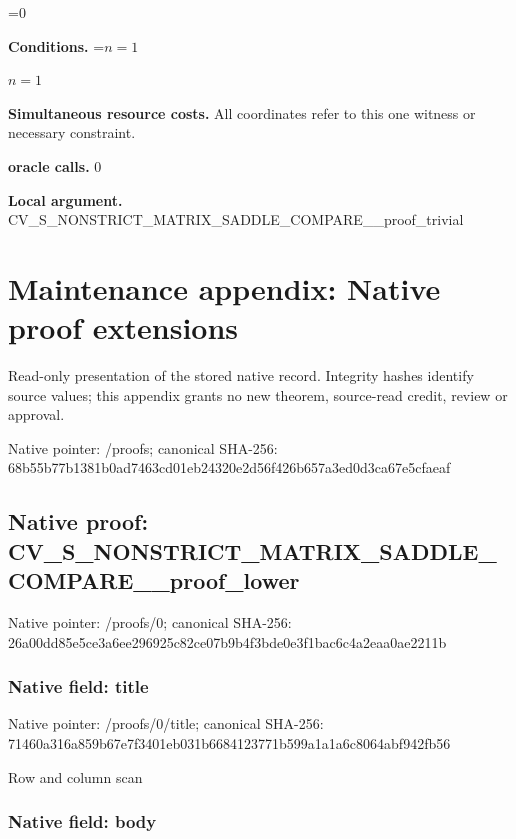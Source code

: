 \documentclass[10pt,a4paper]{article}
\newcommand{\AtlasMath}[1]{\par\begingroup\centering\setbox0=\hbox{$\displaystyle #1$}\ifdim\wd0>1.4\linewidth\typeout{ATLAS WIDE FORMULA: \the\wd0}\fi\ifdim\wd0>\linewidth\resizebox{\linewidth}{!}{\box0}\else\box0\fi\par\endgroup}
\newcommand{\AtlasInlineMath}[1]{\begingroup\setbox0=\hbox{$#1$}\ifdim\wd0>.4\linewidth\endgroup\AtlasMath{#1}\else\endgroup$#1$\fi}
\begin{document}
\AtlasMath{0}


\textbf{Conditions.} \AtlasInlineMath{n=1}



\textbf{Simultaneous resource costs.} All coordinates refer to this one witness or necessary constraint.



\textbf{oracle calls.} 0



\textbf{Local argument.} CV\_S\_NONSTRICT\_MATRIX\_SA\allowbreak{}DDLE\_COMPARE\_\_proof\_triv\allowbreak{}ial



\section{Maintenance appendix: Native proof extensions}


Read-only presentation of the stored native record. Integrity hashes identify source values; this appendix grants no new theorem, source-read credit, review or approval.



Native pointer: /proofs; canonical SHA-256: 68b55b77b1381b0ad7463cd0\allowbreak{}1eb24320e2d56f426b657a3e\allowbreak{}d0d3ca67e5cfaeaf



\subsection{Native proof: CV\_S\_NONSTRICT\_MATRIX\_SA\allowbreak{}DDLE\_COMPARE\_\_proof\_lowe\allowbreak{}r}


Native pointer: /proofs/0; canonical SHA-256: 26a00dd85e5ce3a6ee296925\allowbreak{}c82ce07b9b4f3bde0e3f1bac\allowbreak{}6c4a2eaa0ae2211b



\subsubsection{Native field: title}


Native pointer: /proofs/0/title; canonical SHA-256: 71460a316a859b67e7f3401e\allowbreak{}b031b6684123771b599a1a1a\allowbreak{}6c8064abf942fb56


Row and column scan


\subsubsection{Native field: body}
\end{document}
